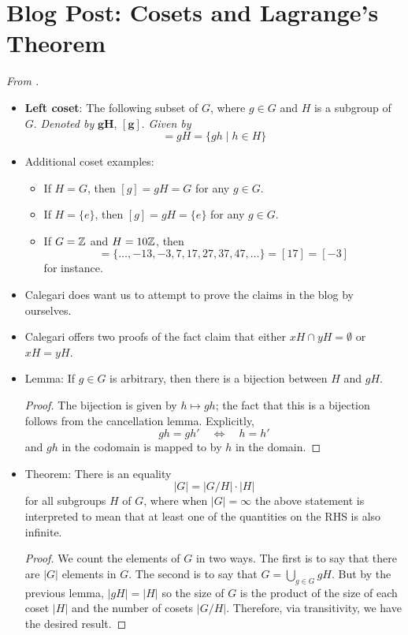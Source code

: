 \documentclass[../notes.tex]{subfiles}
\begin{document}
\section{Blog Post: Cosets and Lagrange's Theorem}
\emph{From \textcite{bib:Calegari}.}
\begin{itemize}
    \item {}\textbf{Left coset}: The following subset of $G$, where $g\in G$ and $H$ is a subgroup of $G$. \emph{Denoted by} $\bm{gH}$, $\bm{[g]}$. \emph{Given by}
    \begin{equation*}
        [g] = gH
        = \{gh\mid h\in H\}
    \end{equation*}
    \item Additional coset examples:
    \begin{itemize}
        \item If $H=G$, then $[g]=gH=G$ for any $g\in G$.
        \item If $H=\{e\}$, then $[g]=gH=\{e\}$ for any $g\in G$.
        \item If $G=\mathbb{Z}$ and $H=10\mathbb{Z}$, then
        \begin{equation*}
            [7] = \{\dots,-13,-3,7,17,27,37,47,\dots\}
            = [17]
            = [-3]
        \end{equation*}
        for instance.
    \end{itemize}
    \item Calegari does want us to attempt to prove the claims in the blog by ourselves.
    \item Calegari offers two proofs of the fact claim that either $xH\cap yH=\emptyset$ or $xH=yH$.
    \item Lemma: If $g\in G$ is arbitrary, then there is a bijection between $H$ and $gH$.
    \begin{proof}
        The bijection is given by $h\mapsto gh$; the fact that this is a bijection follows from the cancellation lemma. Explicitly,
        \begin{equation*}
            gh = gh'
            \quad\Longleftrightarrow\quad
            h = h'
        \end{equation*}
        and $gh$ in the codomain is mapped to by $h$ in the domain.
    \end{proof}
    \item Theorem: There is an equality
    \begin{equation*}
        |G| = |G/H|\cdot|H|
    \end{equation*}
    for all subgroups $H$ of $G$, where when $|G|=\infty$ the above statement is interpreted to mean that at least one of the quantities on the RHS is also infinite.
    \begin{proof}
        We count the elements of $G$ in two ways. The first is to say that there are $|G|$ elements in $G$. The second is to say that $G=\bigcup_{g\in G}gH$. But by the previous lemma, $|gH|=|H|$ so the size of $G$ is the product of the size of each coset $|H|$ and the number of cosets $|G/H|$. Therefore, via transitivity, we have the desired result.
    \end{proof}
\end{itemize}
\end{document}
